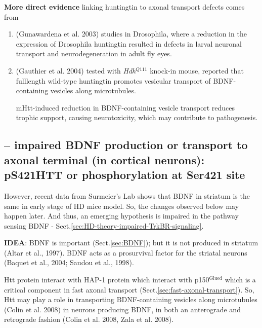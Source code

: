 {\bf More direct evidence} linking huntingtin to axonal transport defects comes
from 
\begin{enumerate}
  
  \item  (Gunawardena et al. 2003) studies in Drosophila, where a reduction in
  the expression of Drosophila huntingtin resulted in defects in larval neuronal transport and
neurodegeneration in adult fly eyes.

  \item (Gauthier et al. 2004) tested with {\it Hdh}$^{Q111}$ knock-in
  mouse, reported that fulllength wild-type huntingtin promotes vesicular
  transport of BDNF-containing vesicles along microtubules.
  
mHtt-induced reduction in BDNF-containing vesicle transport reduces trophic
support, causing neurotoxicity, which may contribute to pathogenesis.

\end{enumerate}


\subsection{-- impaired BDNF production or transport to axonal terminal (in
cortical neurons): pS421HTT or phosphorylation at Ser421 site}
\label{sec:HD-theory-BDNF-impaired-transport}
\label{sec:HD-theory-BDNF-impaired-production}

\begin{mdframed}

However, recent data from Surmeier's Lab shows that BDNF in striatum is the same
in early stage of HD mice model. So, the changes observed below may happen
later. And thus, an emerging hypothesis is impaired in the pathway sensing BDNF
- Sect.\ref{sec:HD-theory-impaired-TrkBR-signaling}.

\end{mdframed}


{\bf IDEA}: BDNF is important (Sect.\ref{sec:BDNF}); but it is not produced in
striatum (Altar et al., 1997). BDNF acts as a prosurvival factor for the
striatal neurons (Baquet et al., 2004; Saudou et al., 1998).

Htt protein interact with HAP-1 protein which interact with p150$^\text{Glued}$
which is a critical component in fast axonal transport
(Sect.\ref{sec:fast-axonal-transport}). So, Htt may play a role in transporting
BDNF-containing vesicles along microtubules (Colin et al. 2008) in neurons
producing BDNF, in both an anterograde and retrograde fashion (Colin et al.
2008, Zala et al. 2008).

